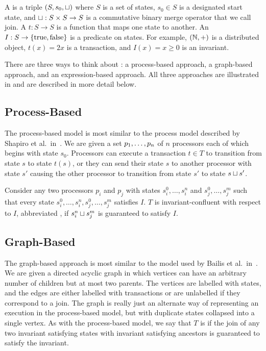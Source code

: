 \section{\Iconfluence{}}
A  is a triple $(S, s_0, \sqcup)$ where $S$ is a set
of states, $s_0 \in S$ is a designated start state, and $\sqcup: S \times S \to
S$ is a commutative binary merge operator that we call join. A
 $t: S \to S$ is a function that maps one state to
another.  An  $I: S \to \{\text{true}, \text{false}\}$ is
a predicate on states. For example, $(\mathbb{N}, +)$ is a distributed object, $t(x)
= 2x$ is a transaction, and $I(x) = x \geq 0$ is an invariant.

There are three ways to think about \Iconfluence{}: a process-based approach, a
graph-based approach, and an expression-based approach. All three approaches
are illustrated in  and are described in more
detail below.



\subsection{Process-Based}
The process-based model is most similar to the process model described by
Shapiro et al.\ in~\cite{shapiro2011conflict}. We are given a set
${p}_{1}, \ldots, {p}_{n}$ of $n$ processors each of which begins with state $s_0$.
Processors can execute a transaction $t \in T$ to transition from state $s$ to
state $t(s)$, or they can send their state $s$ to another processor with state
$s'$ causing the other processor to transition from state $s'$ to state $s
\sqcup s'$.

Consider any two processors $p_i$ and $p_j$ with states $s_i^0, \ldots, s_i^n$
and $s_j^0, \ldots, s_j^m$ such that every state $s_i^0, \ldots, s_i^n, s_j^0,
\ldots, s_j^m$ satisfies $I$. $T$ is invariant-confluent with respect to $I$,
abbreviated , if $s_i^n \sqcup s_j^m$ is guaranteed to
satisfy $I$.

\subsection{Graph-Based}
The graph-based approach is most similar to the model used by Bailis et al.\
in~\cite{bailis2014coordination}. We are given a directed acyclic graph in
which vertices can have an arbitrary number of children but at most two
parents. The vertices are labelled with states, and the edges are either
labelled with transactions or are unlabelled if they correspond to a join. The
graph is really just an alternate way of representing an execution in the
process-based model, but with duplicate states collapsed into a single vertex.
As with the process-based model, we say that $T$ is \Iconfluent{} if the join
of any two invariant satisfying states with invariant satisfying ancestors is
guaranteed to satisfy the invariant.

